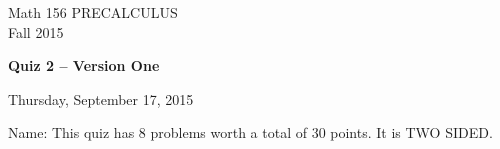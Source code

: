 \documentclass[11pt]{article}
\begin{document}
\begin{center}
\vspace{2in}

\huge{Math 156 PRECALCULUS \\
Fall 2015}

\vfill

\huge{\bf{Quiz 2 -- Version One}}\\

\vspace{0.5in}

\large{Thursday, September 17, 2015}\\

\vfill


{\huge{Name:{\underline{\hspace{2in}}}}}
\vfill
This quiz has 8 problems worth a total of 30 points. It is TWO SIDED. 
\vfill
\end{center}
\newpage
\restoregeometry
\end{document}
